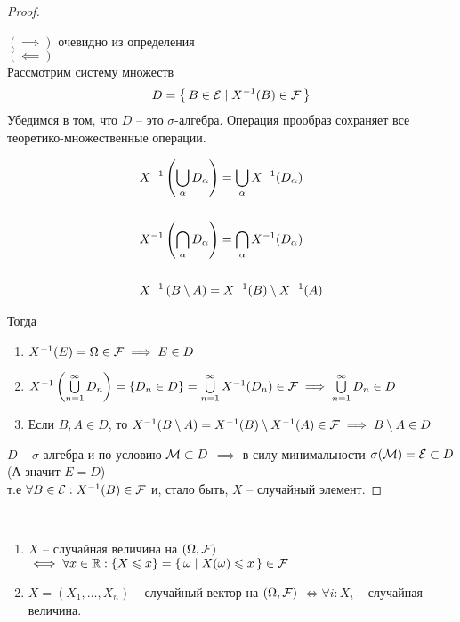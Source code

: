 \begin{proof}~

  $(\implies)$ очевидно из определения\\

  $(\impliedby)$ \\
  Рассмотрим систему множеств
  \begin{align*}
    D = \left\{ \, B \in \mathcal{E} \mid X^{-1}(B) \in \mathcal{F} \, \right\}
  \end{align*}
  Убедимся в том, что $D$ -- это $\sigma$-алгебра. 
  Операция прообраз сохраняет все теоретико-множественные операции.

  \begin{align*}
    &X^{-1}\left( \bigcup_{\alpha} D_{\alpha} \right) = \bigcup_{\alpha} X^{-1} (D_{\alpha})\\\\
    &X^{-1}\left( \bigcap_{\alpha} D_{\alpha} \right) = \bigcap_{\alpha} X^{-1} (D_{\alpha})\\\\
    &X^{-1}\left( B \setminus A \right) = X^{-1} (B) \setminus X^{-1} (A)
  \end{align*}

  Тогда
  \begin{enumerate}
    \item 
      $X^{-1}(E) = \Omega \in \mathcal{F} \implies E \in D$

    \item  
      $X^{-1}\left( \bigcup\limits_{n = 1}^{\infty} D_n \right) = \{ D_n \in D \} = 
      \bigcup\limits_{n = 1}^{\infty} X^{-1}(D_n) \in \mathcal{F} 
      \implies \bigcup\limits_{n = 1}^{\infty} D_n \in D$

    \item
      Если $B, A \in D$, то
      $X^{-1}(B \setminus A) = X^{-1}(B) \setminus X^{-1}(A) \in \mathcal{F} 
      \implies B \setminus A \in D$
  \end{enumerate}

  $D$ -- $\sigma$-алгебра и по условию $\mathcal{M} \subset D$
  $\implies$ в силу минимальности $\sigma(\mathcal{M}) = \mathcal{E} \subset D$ (А значит $E = D$)\\
  т.е $\forall  B \in \mathcal{E} : X^{-1}(B) \in \mathcal{F}$
  и, стало быть, $X$ -- случайный элемент.
\end{proof}

\begin{corollary}~

  \begin{enumerate}
    \item 
      $X$ -- случайная величина на $(\Omega, \mathcal{F})$
      $\iff \forall x \in \mathbb{R} :
       \{ X \leqslant x \} = 
      \left\{ \, \omega \mid X(\omega) \leqslant x \, \right\} \in \mathcal{F}$

    \item $X = (X_1, \ldots, X_n)$ -- случайный вектор на $(\Omega, \mathcal{F})$
          $\iff \forall i : X_i$ -- случайная величина.
  \end{enumerate}

\end{corollary}

